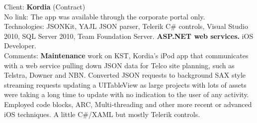 \documentclass{article}
\begin{document}
Client: 	\textbf  {Kordia} (Contract) \\
No link: The app was available through the corporate portal only. \\
Technologies: 	JSONKit, YAJL JSON parser, Telerik C\# controls, Visual Studio 2010, SQL Server 2010, Team Foundation Server. \textbf{ASP.NET web services.}
 iOS Developer. \\
Comments:	{\bf Maintenance} work on KST, Kordia's iPod app that communicates with a web service pulling down JSON data for Telco site planning, such as Telstra, Downer and NBN. Converted JSON requests to background SAX style streaming requests updating a UITableView as large projects with lots of assets were taking a long time to update with no indication to the user of any activity.
	Employed code blocks, ARC, Multi-threading and other more recent or advanced iOS techniques. A little C\#/XAML but mostly Telerik controls.  \\
\\





%
\end{document}
